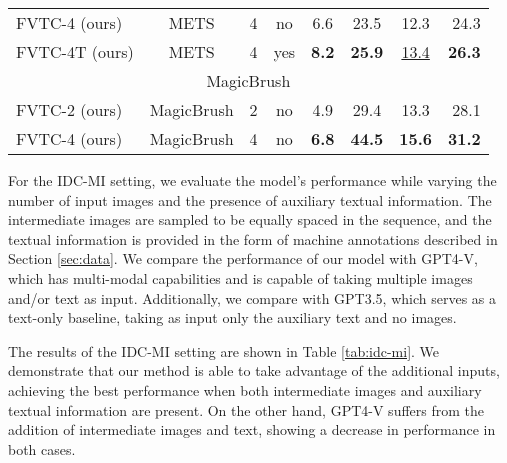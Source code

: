 \documentclass[10pt,twocolumn,letterpaper]{article}
\begin{document}
\begin{table}[ht]
\begin{center}
\begin{small}
\begin{sc}
\begin{tabular}{lccccccr}
         FVTC-4 (ours)& METS & 4 & no  & 6.6 & 23.5 & 12.3 & 24.3\\
         FVTC-4T (ours)& METS & 4 & yes & \bf 8.2 & \bf 25.9 & \underline{13.4} & \bf 26.3\\
         \midrule
         \multicolumn{8}{c}{MagicBrush}\\
         \midrule
         FVTC-2 (ours)& MagicBrush & 2 & no & 4.9 & 29.4 & 13.3 & 28.1\\
         FVTC-4 (ours)& MagicBrush & 4 & no & \bf 6.8 & \bf 44.5 & \bf 15.6 & \bf 31.2\\
         \bottomrule
    \end{tabular}
\end{sc}
\end{small}
\end{center}
\vskip -0.1in
\end{table}

For the IDC-MI setting, we evaluate the model's performance while varying the
number of input images and the presence of auxiliary textual information. The
intermediate images are sampled to be equally spaced in the sequence, and the
textual information is provided in the form of  machine annotations described
in Section \ref{sec:data}.
We compare the performance of our model with
GPT4-V, which has multi-modal capabilities and is capable of taking multiple
images and/or text as input. Additionally, we compare with GPT3.5, which serves as a text-only baseline, taking as input only the auxiliary text and no images.

The results of the IDC-MI setting are shown in Table \ref{tab:idc-mi}. We demonstrate
that our method is able to take advantage of the additional inputs, achieving the best
performance when both intermediate images and auxiliary textual information are present.
On the other hand, GPT4-V suffers from the addition of intermediate images and text,
showing a decrease in performance in both cases.
\end{document}
